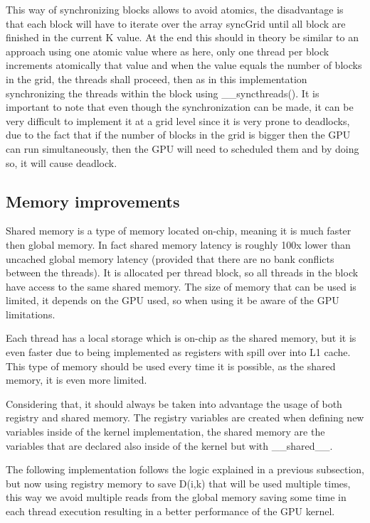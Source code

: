 \documentclass[conference]{IEEEtran}
\begin{document}
This way of synchronizing blocks allows to avoid atomics, the disadvantage is that each block will have to iterate over the array syncGrid until all block are finished in the current K value. At the end this should in theory be similar to an approach using one atomic value where as here, only one thread per block increments atomically that value and when the value equals the number of blocks in the grid, the threads shall proceed, then as in this implementation synchronizing the threads within the block using \_\_syncthreads(). It is important to note that even though the synchronization can be made, it can be very difficult to implement it at a grid level since it is very prone to deadlocks, due to the fact that if the number of blocks in the grid is bigger then the GPU can run simultaneously, then the GPU will need to scheduled them and by doing so, it will cause deadlock.


\subsection{Memory improvements}
Shared memory is a type of memory located on-chip, meaning it is much faster then global memory. In fact shared memory latency is roughly 
100x lower than uncached global memory latency\cite{memory} (provided that there are no bank conflicts between the threads). It is allocated per 
thread block, so all threads in the block have access to the same shared memory. The size of memory that can be used is limited, it depends on the GPU used, so when using it be aware of the GPU limitations.

Each thread has a local storage which is on-chip as the shared memory, but it is even faster due to being implemented as registers with spill over into L1 cache. This type of memory should be used every time it is possible, as the shared memory, it is even more limited.

Considering that, it should always be taken into advantage the usage of both registry and shared memory. The registry variables are created when defining new variables inside of the kernel implementation, the shared memory are the variables that are declared also inside of the kernel but with \_\_shared\_\_.

The following implementation follows the logic explained in a previous subsection, but now using registry memory to save D(i,k) that will be used multiple times, this way we avoid multiple reads from the global memory saving some time in each thread execution resulting in a better performance of the GPU kernel.
\end{document}
